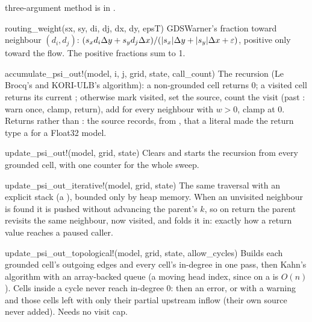 \begin{fnlist}
  three-argument method is in .
\item[routing\_weight(sx, sy, di, dj, dx, dy, epsT)] GDSWarner's fraction toward neighbour $(d_i, d_j)$:
  $(s_x d_i\Delta y + s_y d_j\Delta x)/(|s_x|\Delta y + |s_y|\Delta x + \varepsilon)$, positive only toward the flow. The positive fractions sum to 1.
\item[accumulate\_psi\_out!(model, i, j, grid, state, call\_count)] The recursion (Le Brocq's and KORI-ULB's algorithm): a non-grounded
  cell returns 0; a visited cell returns its current ; otherwise mark visited, set the source, count the visit (past
  : warn once, clamp, return), add  for every neighbour with
  $w>0$, clamp at 0. Returns  rather than : the source records, from , that a
   literal made the return type a  for a Float32 model.
\item[update\_psi\_out!(model, grid, state)] Clears  and starts the recursion from every grounded cell, with one
   counter for the whole sweep.
\item[update\_psi\_out\_iterative!(model, grid, state)] The same traversal with an explicit stack (a ), bounded only by
  heap memory. When an unvisited neighbour is found it is pushed without advancing the parent's $k$, so on return the parent
  revisits the same neighbour, now visited, and folds it in: exactly how a return value reaches a paused caller.
\item[update\_psi\_out\_topological!(model, grid, state, allow\_cycles)] Builds each grounded cell's outgoing edges and every cell's
  in-degree in one pass, then Kahn's algorithm with an array-backed queue (a moving head index, since  on a
   is $O(n)$). Cells inside a cycle never reach in-degree 0: then an error, or with  a warning and
  those cells left with only their partial upstream inflow (their own source never added). Needs no visit cap.
\end{fnlist}

